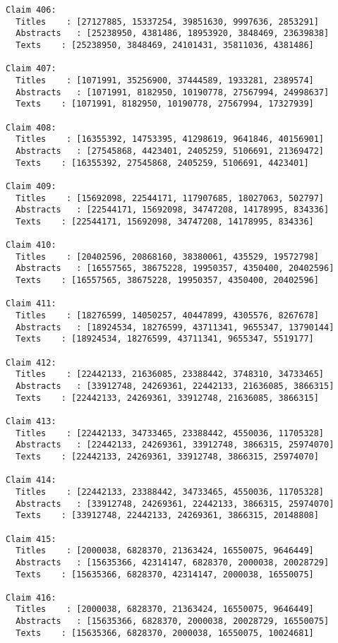 \documentclass[11pt]{article}
\begin{document}
\begin{Verbatim}[commandchars=\\\{\}]
Claim 406:
  Titles    : [27127885, 15337254, 39851630, 9997636, 2853291]
  Abstracts   : [25238950, 4381486, 18953920, 3848469, 23639838]
  Texts    : [25238950, 3848469, 24101431, 35811036, 4381486]

Claim 407:
  Titles    : [1071991, 35256900, 37444589, 1933281, 2389574]
  Abstracts   : [1071991, 8182950, 10190778, 27567994, 24998637]
  Texts    : [1071991, 8182950, 10190778, 27567994, 17327939]

Claim 408:
  Titles    : [16355392, 14753395, 41298619, 9641846, 40156901]
  Abstracts   : [27545868, 4423401, 2405259, 5106691, 21369472]
  Texts    : [16355392, 27545868, 2405259, 5106691, 4423401]

Claim 409:
  Titles    : [15692098, 22544171, 117907685, 18027063, 502797]
  Abstracts   : [22544171, 15692098, 34747208, 14178995, 834336]
  Texts    : [22544171, 15692098, 34747208, 14178995, 834336]

Claim 410:
  Titles    : [20402596, 20868160, 38380061, 435529, 19572798]
  Abstracts   : [16557565, 38675228, 19950357, 4350400, 20402596]
  Texts    : [16557565, 38675228, 19950357, 4350400, 20402596]

Claim 411:
  Titles    : [18276599, 14050257, 40447899, 4305576, 8267678]
  Abstracts   : [18924534, 18276599, 43711341, 9655347, 13790144]
  Texts    : [18924534, 18276599, 43711341, 9655347, 5519177]

Claim 412:
  Titles    : [22442133, 21636085, 23388442, 3748310, 34733465]
  Abstracts   : [33912748, 24269361, 22442133, 21636085, 3866315]
  Texts    : [22442133, 24269361, 33912748, 21636085, 3866315]

Claim 413:
  Titles    : [22442133, 34733465, 23388442, 4550036, 11705328]
  Abstracts   : [22442133, 24269361, 33912748, 3866315, 25974070]
  Texts    : [22442133, 24269361, 33912748, 3866315, 25974070]

Claim 414:
  Titles    : [22442133, 23388442, 34733465, 4550036, 11705328]
  Abstracts   : [33912748, 24269361, 22442133, 3866315, 25974070]
  Texts    : [33912748, 22442133, 24269361, 3866315, 20148808]

Claim 415:
  Titles    : [2000038, 6828370, 21363424, 16550075, 9646449]
  Abstracts   : [15635366, 42314147, 6828370, 2000038, 20028729]
  Texts    : [15635366, 6828370, 42314147, 2000038, 16550075]

Claim 416:
  Titles    : [2000038, 6828370, 21363424, 16550075, 9646449]
  Abstracts   : [15635366, 6828370, 2000038, 20028729, 16550075]
  Texts    : [15635366, 6828370, 2000038, 16550075, 10024681]


\end{Verbatim}
\end{document}
